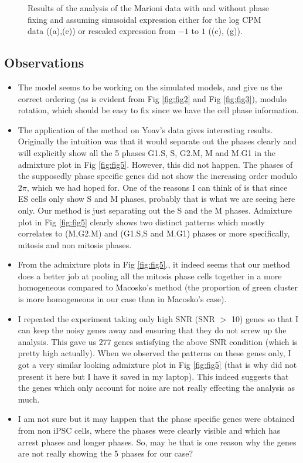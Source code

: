 \documentclass[11pt]{article}
\begin{document}
\begin{figure}[ht]
    \caption{Results of the analysis of the Marioni data with and without phase fixing and assuming sinusoidal expression either for the log CPM data ((a),(e)) or rescaled expression from $-1$ to $1$ ((c), (g)).}
 \label{fig:fig10}
 \end{figure}


\subsection{Observations}

\begin{itemize}
\item The model seems to be working on the simulated models, and give us the correct ordering (as is evident from Fig \ref{fig:fig2} and Fig \ref{fig:fig3}), modulo rotation, which should be easy to fix since we have the cell phase information.

\item The application of the method on Yoav's data gives interesting results. Originally the intuition was that it would separate out the phases clearly and will explicitly show all the 5 phases G1.S, S, G2.M, M and M.G1 in the admixture plot in Fig \ref{fig:fig5}. However, this did not happen. The phases of the supposedly phase specific genes did not show the increasing order modulo $2 \pi$, which we had hoped for. One of the reasons I can think of is that since ES cells only show S and M phases, probably that is what we are seeing here only. Our method is just separating out the S and the M phases. Admixture plot in Fig \ref{fig:fig5} clearly shows two distinct patterns which mostly correlates to (M,G2.M) and (G1.S,S and M.G1) phases or more specifically, mitosis and non mitosis phases. 

\item From the admixture plots in Fig \ref{fig:fig5}., it indeed seems that our method does a better job at pooling all the mitosis phase cells together in a more homogeneous compared to Macosko's method (the proportion of green cluster is more homogeneous in our case than in Macosko's case). 

\item I repeated the experiment taking only high SNR (SNR $>$ 10) genes so that I can keep the noisy genes away and ensuring that they do not screw up the analysis. This gave us $277$ genes satisfying the above SNR condition (which is pretty high actually). When we observed the patterns on these genes only, I got a very similar looking admixture plot in Fig \ref{fig:fig5} (that is why did not present it here but I have it saved in my laptop). This indeed suggests that the genes which only account for noise are not really effecting the analysis as much.

\item I am not sure but it may happen that the phase specific genes were obtained from non iPSC cells, where the phases were clearly visible and which has arrest phases and longer phases. So, may be that is one reason why the genes are not really showing the 5 phases for our case?

\end{itemize}
\end{document}
